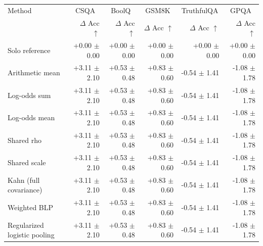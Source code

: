 \begin{tabular}{lrrrrr}
\toprule
Method & \multicolumn{1}{c}{CSQA} & \multicolumn{1}{c}{BoolQ} & \multicolumn{1}{c}{GSM8K} & \multicolumn{1}{c}{TruthfulQA} & \multicolumn{1}{c}{GPQA} \\
 & $\Delta$ Acc $\uparrow$ & $\Delta$ Acc $\uparrow$ & $\Delta$ Acc $\uparrow$ & $\Delta$ Acc $\uparrow$ & $\Delta$ Acc $\uparrow$ \\
\midrule
Solo reference & +0.00 {\scriptsize $\pm$ 0.00} & +0.00 {\scriptsize $\pm$ 0.00} & +0.00 {\scriptsize $\pm$ 0.00} & +0.00 {\scriptsize $\pm$ 0.00} & +0.00 {\scriptsize $\pm$ 0.00} \\
Arithmetic mean & +3.11 {\scriptsize $\pm$ 2.10} & +0.53 {\scriptsize $\pm$ 0.48} & +0.83 {\scriptsize $\pm$ 0.60} & -0.54 {\scriptsize $\pm$ 1.41} & -1.08 {\scriptsize $\pm$ 1.78} \\
Log-odds sum & +3.11 {\scriptsize $\pm$ 2.10} & +0.53 {\scriptsize $\pm$ 0.48} & +0.83 {\scriptsize $\pm$ 0.60} & -0.54 {\scriptsize $\pm$ 1.41} & -1.08 {\scriptsize $\pm$ 1.78} \\
Log-odds mean & +3.11 {\scriptsize $\pm$ 2.10} & +0.53 {\scriptsize $\pm$ 0.48} & +0.83 {\scriptsize $\pm$ 0.60} & -0.54 {\scriptsize $\pm$ 1.41} & -1.08 {\scriptsize $\pm$ 1.78} \\
Shared rho & +3.11 {\scriptsize $\pm$ 2.10} & +0.53 {\scriptsize $\pm$ 0.48} & +0.83 {\scriptsize $\pm$ 0.60} & -0.54 {\scriptsize $\pm$ 1.41} & -1.08 {\scriptsize $\pm$ 1.78} \\
Shared scale & +3.11 {\scriptsize $\pm$ 2.10} & +0.53 {\scriptsize $\pm$ 0.48} & +0.83 {\scriptsize $\pm$ 0.60} & -0.54 {\scriptsize $\pm$ 1.41} & -1.08 {\scriptsize $\pm$ 1.78} \\
Kahn (full covariance) & +3.11 {\scriptsize $\pm$ 2.10} & +0.53 {\scriptsize $\pm$ 0.48} & +0.83 {\scriptsize $\pm$ 0.60} & -0.54 {\scriptsize $\pm$ 1.41} & -1.08 {\scriptsize $\pm$ 1.78} \\
Weighted BLP & +3.11 {\scriptsize $\pm$ 2.10} & +0.53 {\scriptsize $\pm$ 0.48} & +0.83 {\scriptsize $\pm$ 0.60} & -0.54 {\scriptsize $\pm$ 1.41} & -1.08 {\scriptsize $\pm$ 1.78} \\
Regularized logistic pooling & +3.11 {\scriptsize $\pm$ 2.10} & +0.53 {\scriptsize $\pm$ 0.48} & +0.83 {\scriptsize $\pm$ 0.60} & -0.54 {\scriptsize $\pm$ 1.41} & -1.08 {\scriptsize $\pm$ 1.78} \\

\end{tabular}
